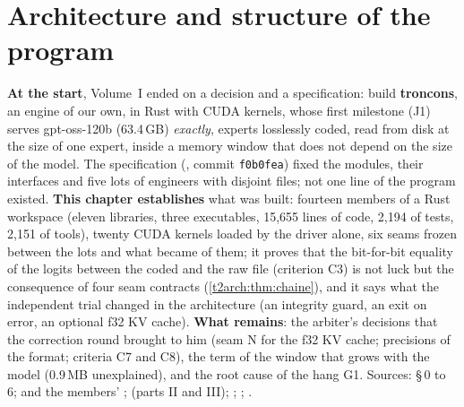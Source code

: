 


\chapter{Architecture and structure of the program}\label{t2arch:ch}

\begin{origine}
\textbf{At the start}, Volume~I ended on a decision and a specification: build \textbf{troncons}, an engine of our own, in Rust with CUDA kernels, whose first milestone (J1) serves gpt-oss-120b (63.4\,GB) \emph{exactly}, experts losslessly coded, read from disk at the size of one expert, inside a memory window that does not depend on the size of the model. The specification (, commit \texttt{f0b0fea}) fixed the modules, their interfaces and five lots of engineers with disjoint files; not one line of the program existed.
\textbf{This chapter establishes} what was built: fourteen members of a Rust workspace (eleven libraries, three executables, 15{,}655 lines of code, 2{,}194 of tests, 2{,}151 of tools), twenty CUDA kernels loaded by the driver alone, six seams frozen between the lots and what became of them; it proves that the bit-for-bit equality of the logits between the coded and the raw file (criterion C3) is not luck but the consequence of four seam contracts (\cref{t2arch:thm:chaine}), and it says what the independent trial changed in the architecture (an integrity guard, an exit on error, an optional f32 KV cache).
\textbf{What remains}: the arbiter's decisions that the correction round brought to him (seam N for the f32 KV cache; precisions of the format; criteria C7 and C8), the term of the window that grows with the model (0.9\,MB unexplained), and the root cause of the hang G1.
Sources:  §\,0 to 6;  and the members' ;  (parts II and III); ; ; .
\end{origine}


